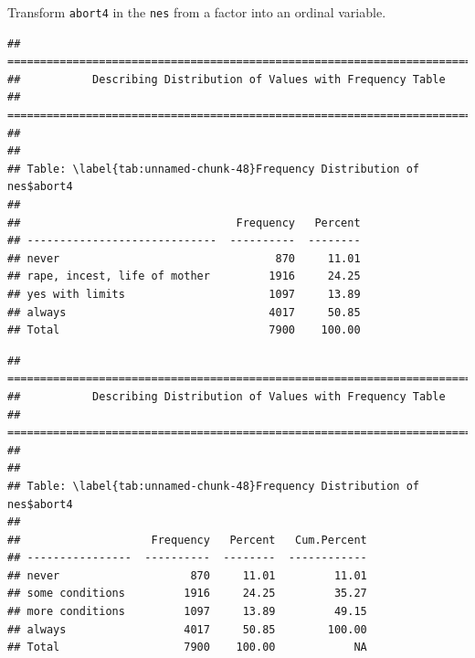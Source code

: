 \documentclass[
]{book}
\newenvironment{Shaded}{\begin{snugshade}}{\end{snugshade}}
\newcommand{\AttributeTok}[1]{\textcolor[rgb]{0.13,0.29,0.53}{#1}}
\newcommand{\CommentTok}[1]{\textcolor[rgb]{0.56,0.35,0.01}{\textit{#1}}}
\newcommand{\FunctionTok}[1]{\textcolor[rgb]{0.13,0.29,0.53}{\textbf{#1}}}
\newcommand{\NormalTok}[1]{#1}
\newcommand{\OtherTok}[1]{\textcolor[rgb]{0.56,0.35,0.01}{#1}}
\newcommand{\SpecialCharTok}[1]{\textcolor[rgb]{0.81,0.36,0.00}{\textbf{#1}}}
\newcommand{\StringTok}[1]{\textcolor[rgb]{0.31,0.60,0.02}{#1}}
\begin{document}
Transform \texttt{abort4} in the \texttt{nes} from a factor into an ordinal variable.

\begin{Shaded}
\end{Shaded}

\begin{verbatim}
## ===========================================================================
##           Describing Distribution of Values with Frequency Table
## ===========================================================================
## 
## 
## Table: \label{tab:unnamed-chunk-48}Frequency Distribution of nes$abort4
## 
##                                 Frequency   Percent
## -----------------------------  ----------  --------
## never                                 870     11.01
## rape, incest, life of mother         1916     24.25
## yes with limits                      1097     13.89
## always                               4017     50.85
## Total                                7900    100.00
\end{verbatim}

\begin{Shaded}
\end{Shaded}

\begin{verbatim}
## ===========================================================================
##           Describing Distribution of Values with Frequency Table
## ===========================================================================
## 
## 
## Table: \label{tab:unnamed-chunk-48}Frequency Distribution of nes$abort4
## 
##                    Frequency   Percent   Cum.Percent
## ----------------  ----------  --------  ------------
## never                    870     11.01         11.01
## some conditions         1916     24.25         35.27
## more conditions         1097     13.89         49.15
## always                  4017     50.85        100.00
## Total                   7900    100.00            NA
\end{verbatim}
\end{document}
